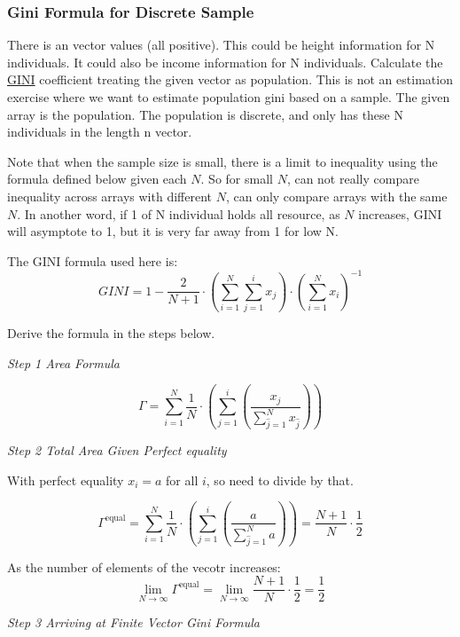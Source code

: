 \documentclass[
]{book}
\begin{document}
\hypertarget{gini-formula-for-discrete-sample}{%
\subsubsection{Gini Formula for Discrete Sample}\label{gini-formula-for-discrete-sample}}

There is an vector values (all positive). This could be height information for N individuals. It could also be income information for N individuals. Calculate the \href{https://en.wikipedia.org/wiki/Gini_coefficient}{GINI} coefficient treating the given vector as population. This is not an estimation exercise where we want to estimate population gini based on a sample. The given array is the population. The population is discrete, and only has these N individuals in the length n vector.

Note that when the sample size is small, there is a limit to inequality using the formula defined below given each \(N\). So for small \(N\), can not really compare inequality across arrays with different \(N\), can only compare arrays with the same \(N\). In another word, if 1 of N individual holds all resource, as \(N\) increases, GINI will asymptote to 1, but it is very far away from 1 for low N.

The GINI formula used here is:
\[
 GINI =
  1 - \frac{2}{N+1}
  \cdot
  \left(\sum_{i=1}^N \sum_{j=1}^{i} x_j\right)
  \cdot
  \left(
    \sum_{i=1}^N x_i
  \right)^{-1}
\]

Derive the formula in the steps below.

\emph{Step 1 Area Formula}

\[
 \Gamma = \sum_{i=1}^N \frac{1}{N} \cdot \left(
     \sum_{j=1}^{i} \left(
      \frac{x_j}{\sum_{\widehat{j}=1}^N x_{\widehat{j}} }
      \right)
  \right)
\]

\emph{Step 2 Total Area Given Perfect equality}

With perfect equality \(x_i=a\) for all \(i\), so need to divide by that.

\[
 \Gamma^{\text{equal}} = \sum_{i=1}^N \frac{1}{N} \cdot \left(
     \sum_{j=1}^{i} \left(
      \frac{a}{\sum_{\widehat{j}=1}^N a }
      \right)
  \right)
  = \frac{N+1}{N}\cdot\frac{1}{2}
\]

As the number of elements of the vecotr increases:
\[
 \lim_{N \rightarrow \infty}\Gamma^{\text{equal}}
  = \lim_{N \rightarrow \infty} \frac{N+1}{N}\cdot\frac{1}{2}
  = \frac{1}{2}
\]

\emph{Step 3 Arriving at Finite Vector Gini Formula}
\end{document}
